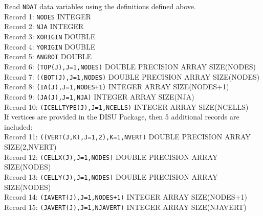 \vspace{5mm}
\noindent Read \texttt{NDAT} data variables using the definitions defined above. \\
\noindent Record 1: \texttt{NODES} {\color{red} \footnotesize{INTEGER}} \\
\noindent Record 2: \texttt{NJA} {\color{red} \footnotesize{INTEGER}} \\
\noindent Record 3: \texttt{XORIGIN} {\color{red} \footnotesize{DOUBLE}} \\
\noindent Record 4: \texttt{YORIGIN} {\color{red} \footnotesize{DOUBLE}} \\
\noindent Record 5: \texttt{ANGROT} {\color{red} \footnotesize{DOUBLE}} \\
\noindent Record 6: \texttt{(TOP(J),J=1,NODES)} {\color{red} \footnotesize{DOUBLE PRECISION ARRAY SIZE(NODES)}} \\
\noindent Record 7: \texttt{((BOT(J),J=1,NODES)} {\color{red} \footnotesize{DOUBLE PRECISION ARRAY SIZE(NODES)}} \\
\noindent Record 8: \texttt{(IA(J),J=1,NODES+1)} {\color{red} \footnotesize{INTEGER ARRAY SIZE(NODES+1)}} \\
\noindent Record 9: \texttt{(JA(J),J=1,NJA)} {\color{red} \footnotesize{INTEGER ARRAY SIZE(NJA)}} \\
\noindent Record 10: \texttt{(ICELLTYPE(J),J=1,NCELLS)} {\color{red} \footnotesize{INTEGER ARRAY SIZE(NCELLS)}} \\

\vspace{5mm}
\noindent If vertices are provided in the DISU Package, then 5 additional records are included: \\
\noindent Record 11: \texttt{((VERT(J,K),J=1,2),K=1,NVERT)} {\color{red} \footnotesize{DOUBLE PRECISION ARRAY SIZE(2,NVERT)}} \\
\noindent Record 12: \texttt{(CELLX(J),J=1,NODES)} {\color{red} \footnotesize{DOUBLE PRECISION ARRAY SIZE(NODES)}}\\
\noindent Record 13: \texttt{(CELLY(J),J=1,NODES)} {\color{red} \footnotesize{DOUBLE PRECISION ARRAY SIZE(NODES)}} \\
\noindent Record 14: \texttt{(IAVERT(J),J=1,NODES+1)} {\color{red} \footnotesize{INTEGER ARRAY SIZE(NODES+1)}} \\
\noindent Record 15: \texttt{(JAVERT(J),J=1,NJAVERT)} {\color{red} \footnotesize{INTEGER ARRAY SIZE(NJAVERT)}} \\


\newpage
